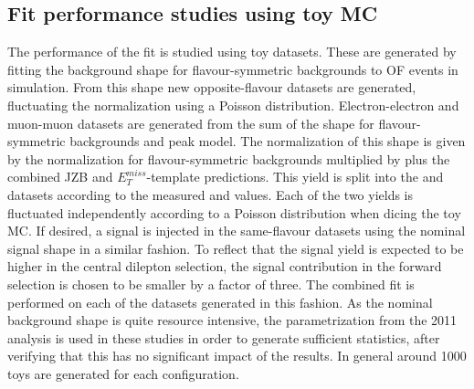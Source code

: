 \subsection{Fit performance studies using toy MC}
\label{sec:toys}
The performance of the fit is studied using toy datasets. These are generated by fitting the background shape for flavour-symmetric backgrounds to OF events in simulation. From this shape new opposite-flavour datasets are generated, fluctuating the normalization using a Poisson distribution. Electron-electron and muon-muon datasets are generated from the sum of the  shape for flavour-symmetric backgrounds and \Z peak model. The normalization of this shape is given by the normalization for flavour-symmetric backgrounds multiplied by \Rsfof plus the combined JZB and $E_T^{miss}$-template predictions. This yield is split into the \EE and \MM datasets according to the measured \Reeof and \Rmmof values. Each of the two yields is fluctuated independently according to a Poisson distribution when dicing the toy MC. If desired, a signal is injected in the same-flavour datasets using the nominal signal shape in a similar fashion. To reflect that the signal yield is expected to be higher in the central dilepton selection, the signal contribution in the forward selection is chosen to be smaller by a factor of three. The combined fit is performed on each of the datasets generated in this fashion. As the nominal background shape is quite resource intensive, the parametrization from the 2011 analysis is used in these studies in order to generate sufficient statistics, after verifying that this has no significant impact of the results. In general around 1000 toys are generated for each configuration.
